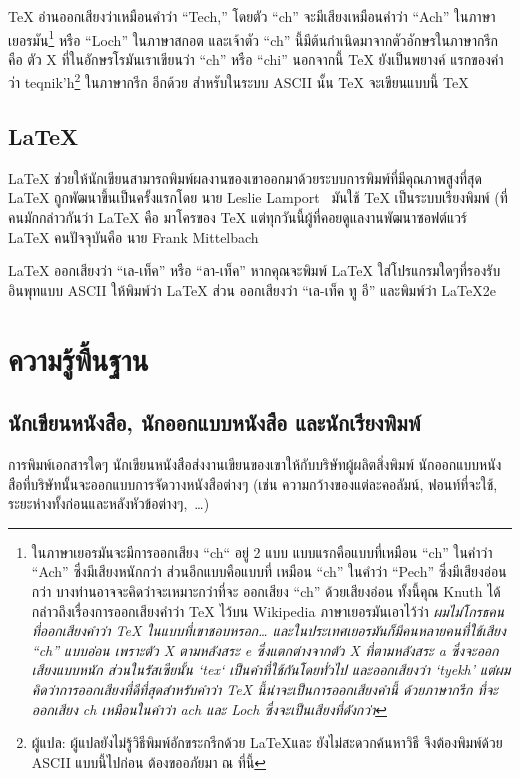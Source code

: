 \TeX{} อ่านออกเสียงว่าเหมือนคำว่า ``Tech,'' โดยตัว ``ch'' จะมีเสียงเหมือนคำว่า
``Ach'' ในภาษาเยอรมัน\footnote{ในภาษาเยอรมันจะมีการออกเสียง ``ch`` อยู่ 2 แบบ
แบบแรกคือแบบที่เหมือน ``ch'' ในคำว่า ``Ach'' ซึ่งมีเสียงหนักกว่า ส่วนอีกแบบคือแบบที่%
เหมือน ``ch'' ในคำว่า ``Pech'' ซึ่งมีเสียงอ่อนกว่า บางท่านอาจจะคิดว่าจะเหมาะกว่าที่จะ%
ออกเสียง ``ch'' ด้วยเสียงอ่อน ทั้งนี้คุณ Knuth ได้กล่าวถึงเรื่องการออกเสียงคำว่า \TeX{}
ไว้บน Wikipedia ภาษาเยอรมันเอาไว้ว่า \emph{ผมไม่โกรธคนที่ออกเสียงคำว่า \TeX{}
ในแบบที่เขาชอบหรอก\ldots{} และในประเทศเยอรมันก็มีคนหลายคนที่ใช้เสียง ``ch''
แบบอ่อน เพราะตัว X ตามหลังสระ e ซึ่งแตกต่างจากตัว X ที่ตามหลังสระ a
ซึ่งจะออกเสียงแบบหนัก ส่วนในรัสเซียนั้น `tex` เป็นคำที่ใช้กันโดยทั่วไป และออกเสียงว่า
`tyekh' แต่ผมคิดว่าการออกเสียงที่ดีที่สุดสำหรับคำว่า \TeX{} นี้น่าจะเป็นการออกเสียงคำนี้%
ด้วยภาษากรีก ที่จะออกเสียง ch เหมือนในคำว่า ach และ Loch ซึ่งจะเป็นเสียงที่ดังกว่า}}
หรือ ``Loch'' ในภาษาสกอต และเจ้าตัว ``ch'' นี้มีต้นกำเนิดมาจากตัวอักษรในภาษากรีก คือ
ตัว X ที่ในอักษรโรมันเราเขียนว่า ``ch'' หรือ ``chi'' นอกจากนี้ \TeX{} ยังเป็นพยางค์%
แรกของคำว่า teqnik'h\footnote{ผู้แปล: ผู้แปลยังไม่รู้วิธีพิมพ์อักขระกรีกด้วย \LaTeX และ
ยังไม่สะดวกค้นหาวิธี จึงต้องพิมพ์ด้วย ASCII แบบนี้ไปก่อน ต้องขออภัยมา ณ ที่นี้} ในภาษากรีก%
อีกด้วย สำหรับในระบบ ASCII นั้น \TeX{} จะเขียนแบบนี้ TeX

\subsection{\LaTeX}

\LaTeX{} ช่วยให้นักเขียนสามารถพิมพ์ผลงานของเขาออกมาด้วยระบบการพิมพ์ที่มีคุณภาพสูงที่สุด
\LaTeX{} ถูกพัฒนาขึ้นเป็นครั้งแรกโดย นาย Leslie
Lamport~\cite{manual}  มันใช้ \TeX{} เป็นระบบเรียงพิมพ์ (ที่คนมักกล่าวกันว่า
\LaTeX{} คือ มาโครของ \TeX{} แต่ทุกวันนี้ผู้ที่คอยดูแลงานพัฒนาซอฟต์แวร์ \LaTeX{}
คนปัจจุบันคือ นาย Frank Mittelbach

\LaTeX{} ออกเสียงว่า ``เล-เท็ค'' หรือ ``ลา-เท็ค'' หากคุณจะพิมพ์ \LaTeX{}
ใส่โปรแกรมใดๆที่รองรับอินพุทแบบ ASCII ให้พิมพ์ว่า LaTeX ส่วน \LaTeXe{}
ออกเสียงว่า ``เล-เท็ค ทู อี'' และพิมพ์ว่า LaTeX2e

\section{ความรู้พื้นฐาน}

\subsection{นักเขียนหนังสือ, นักออกแบบหนังสือ และนักเรียงพิมพ์}

การพิมพ์เอกสารใดๆ นักเขียนหนังสือส่งงานเขียนของเขาให้กับบริษัทผู้ผลิตสิ่งพิมพ์ นักออกแบบหนัง%
สือที่บริษัทนั้นจะออกแบบการจัดวางหนังสือต่างๆ (เช่น ความกว้างของแต่ละคอลัมน์, ฟอนท์ที่จะใช้,
ระยะห่างทั้งก่อนและหลังหัวข้อต่างๆ,~\dots)

\shbtoaddmoretranslation

